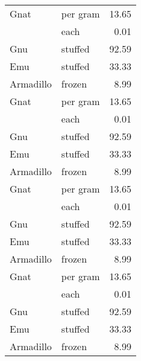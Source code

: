 {
\large
{}

\tablelasttail{}
\begin{center}
\begin{xtabular}{llr}
Gnat      & per gram & 13.65 \\
          & each     & 0.01  \\
Gnu       & stuffed  & 92.59 \\
Emu       & stuffed  & 33.33 \\
Armadillo & frozen   & 8.99  \\
Gnat      & per gram & 13.65 \\
          & each     & 0.01  \\
Gnu       & stuffed  & 92.59 \\
Emu       & stuffed  & 33.33 \\
Armadillo & frozen   & 8.99  \\
Gnat      & per gram & 13.65 \\
          & each     & 0.01  \\
Gnu       & stuffed  & 92.59 \\
Emu       & stuffed  & 33.33 \\
Armadillo & frozen   & 8.99  \\
Gnat      & per gram & 13.65 \\
          & each     & 0.01  \\
Gnu       & stuffed  & 92.59 \\
Emu       & stuffed  & 33.33 \\
Armadillo & frozen   & 8.99  \\

\end{xtabular}
\end{center}}
